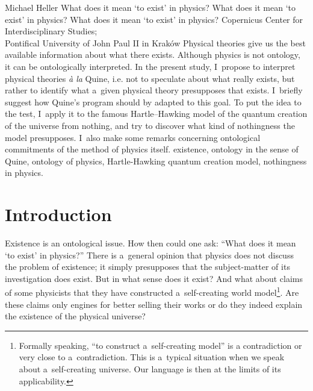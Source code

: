 
\begin{artengenv}{Michael Heller}
	{What does it mean ‘to exist’ in physics?}
	{What does it mean ‘to exist’ in physics?}
	{What does it mean ‘to exist’ in physics?}
	{Copernicus Center for Interdisciplinary Studies;\\
		Pontifical University of John Paul II in Kraków}
	{Physical theories give us the best available information about what there exists. Although physics is not ontology, it
		can be ontologically interpreted. In the present study, I~propose to interpret physical theories \textit{à la} Quine,
		i.e. not to speculate about what really exists, but rather to identify what a~given physical theory presupposes that
		exists. I~briefly suggest how Quine’s program should by adapted to this goal. To put the idea to the test, I~apply it
		to the famous Hartle–Hawking model of the quantum creation of the universe from nothing, and try to discover what kind
		of nothingness the model presupposes. I~also make some remarks concerning ontological commitments of the method of
		physics itself.}
	{existence, ontology in the sense of Quine, ontology of physics, Hartle-Hawking quantum creation model, nothingness in
		physics.}
	




\section{Introduction}
\lettrine[loversize=0.13,lines=2,lraise=-0.05,nindent=0em,findent=0.2pt]%
{E}{}xistence is an ontological issue. How then could one ask: ``What does it mean ‘to exist’ in physics?'' There is a~general
opinion that physics does not discuss the problem of existence; it simply presupposes that the subject-matter of its
investigation does exist. But in what sense does it exist? And what about claims of some physicists that they have
constructed a~self-creating world model\footnote{Formally speaking, ``to construct a~self-creating model'' is a
contradiction or very close to a~contradiction. This is a~typical situation when we speak about a~self-creating
universe. Our language is then at the limits of its applicability.}. Are these claims only engines for better selling
their works or do they indeed explain the existence of the physical universe?


\end{artengenv}
